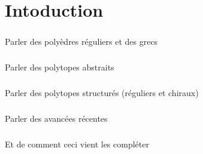 \chapter*{Intoduction}

\paragraph{}
Parler des polyèdres réguliers et des grecs

\paragraph{}
Parler des polytopes abstraits

\paragraph{}
Parler des polytopes structurés (réguliers et chiraux)

\paragraph{}
Parler des avancées récentes

\paragraph{}
Et de comment ceci vient les compléter
